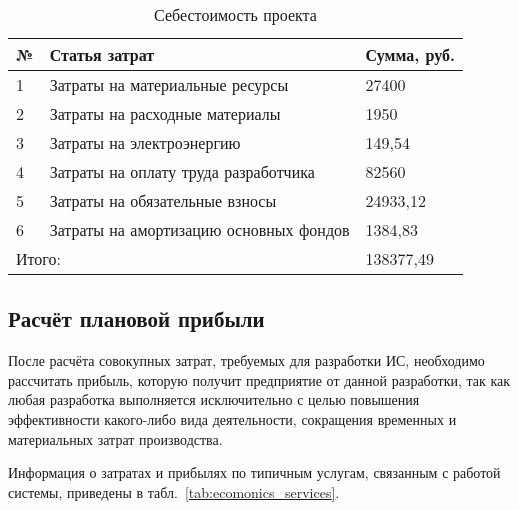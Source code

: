 \begin{footnotesize}
\begin{longtable}[h]{|p{}|p{}|p{}|}
	\caption{\label{tab:sebest}Себестоимость проекта} \\
	\hline
		\textbf{№} &
		\textbf{Статья затрат} &
		\textbf{Сумма, руб.} \\
	\hline
		1 & Затраты на материальные ресурсы & 27400 \\ \hline
		2 & Затраты на расходные материалы & 1950 \\ \hline
		3 & Затраты на электроэнергию & 149,54 \\ \hline
		4 & Затраты на оплату труда разработчика & 82560 \\ \hline
		5 & Затраты на обязательные взносы & 24933,12 \\ \hline
		6 & Затраты на амортизацию основных фондов & 1384,83 \\ \hline
		\multicolumn{2}{|l|}{Итого:} & 138377,49 \\ \hline
\end{longtable}
\end{footnotesize}

\subsection{Расчёт плановой прибыли}

После расчёта совокупных затрат, требуемых для разработки ИС, необходимо рассчитать прибыль, которую получит предприятие от данной разработки, так как любая разработка выполняется исключительно с целью повышения эффективности какого-либо вида деятельности, сокращения временных и материальных затрат производства.

Информация о затратах и прибылях по типичным услугам, связанным с работой системы, приведены в табл.~\ref{tab:ecomonics_services}.

